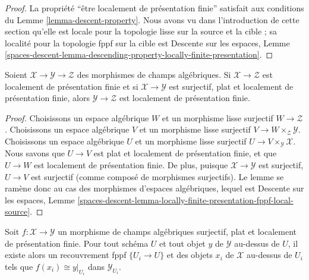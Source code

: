 \begin{proof}
La propriété ``être localement de présentation finie'' satisfait aux
conditions du Lemme \ref{lemma-descent-property}. Nous avons vu dans
l'introduction de cette section qu'elle est locale pour la topologie lisse sur
la source et la cible ; sa localité pour la topologie fppf sur la cible est
Descente sur les espaces, Lemme
\ref{spaces-descent-lemma-descending-property-locally-finite-presentation}.
\end{proof}

\begin{lemma}
\label{lemma-flat-finite-presentation-permanence}
Soient $\mathcal{X} \to \mathcal{Y} \to \mathcal{Z}$ des morphismes de
champs algébriques. Si $\mathcal{X} \to \mathcal{Z}$ est localement de
présentation finie et si $\mathcal{X} \to \mathcal{Y}$ est surjectif, plat et
localement de présentation finie, alors $\mathcal{Y} \to \mathcal{Z}$ est
localement de présentation finie.
\end{lemma}

\begin{proof}
Choisissons un espace algébrique $W$ et un morphisme lisse surjectif
$W \to \mathcal{Z}$. Choisissons un espace algébrique $V$ et un morphisme
lisse surjectif $V \to W \times_\mathcal{Z} \mathcal{Y}$. Choisissons un
espace algébrique $U$ et un morphisme lisse surjectif
$U \to V \times_\mathcal{Y} \mathcal{X}$. Nous savons que $U \to V$ est plat
et localement de présentation finie, et que $U \to W$ est localement de
présentation finie. De plus, puisque $\mathcal{X} \to \mathcal{Y}$ est
surjectif, $U \to V$ est surjectif (comme composé de morphismes surjectifs).
Le lemme se ramène donc au cas des morphismes d'espaces algébriques, lequel est
Descente sur les espaces, Lemme
\ref{spaces-descent-lemma-locally-finite-presentation-fppf-local-source}.
\end{proof}

\begin{lemma}
\label{lemma-surjective-flat-locally-finite-presentation}
Soit $f : \mathcal{X} \to \mathcal{Y}$ un morphisme de champs algébriques
surjectif, plat et localement de présentation finie. Pour tout schéma $U$ et
tout objet $y$ de $\mathcal{Y}$ au-dessus de $U$, il existe alors un
recouvrement fppf $\{U_i \to U\}$ et des objets $x_i$ de $\mathcal{X}$
au-dessus de $U_i$ tels que $f(x_i) \cong y|_{U_i}$ dans
$\mathcal{Y}_{U_i}$.
\end{lemma}

